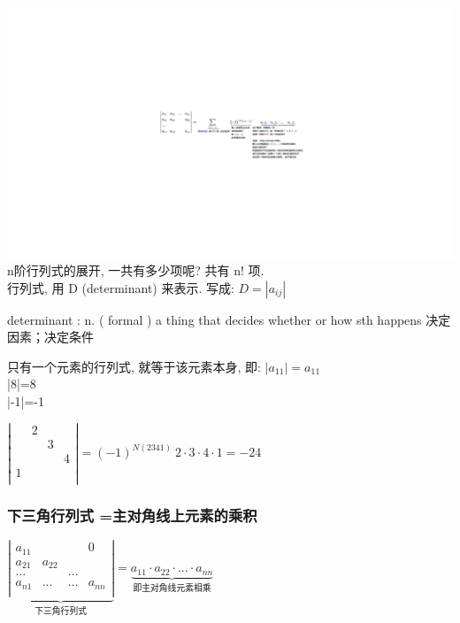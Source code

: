 \documentclass[UTF8]{ctexart}
\begin{document}
	\includegraphics[width=1\textwidth]{img/0003.pdf}\\
	
	n阶行列式的展开, 一共有多少项呢? 共有 n! 项. \\
	
	行列式, 用 D (determinant) 来表示. 写成: $	D=\left| a_{ij} \right|	$
	
	\begin{myEnvSample}
	determinant : n. ( formal ) a thing that decides whether or how sth happens 决定因素；决定条件
	\end{myEnvSample}

	只有一个元素的行列式, 就等于该元素本身, 即:	$	\left| a_{11} \right|=a_{11}	$\\
	|8|=8\\
	|-1|=-1\\
	
	\begin{myEnvSample}
$
\left| \begin{matrix}
	&		2&		&		\\
	&		&		3&		\\
	&		&		&		4\\
	1&		&		&		\\
\end{matrix} \right|=\left( -1 \right) ^{N\left( 2341 \right)}\ 2\cdot 3\cdot 4\cdot 1=-24
$
	\end{myEnvSample}
	
	
	
\subsubsection{下三角行列式 =主对角线上元素的乘积}

$
\underset{\text{下三角行列式}}{\underbrace{\left| \begin{matrix}
			a_{11}&		&		&	0	\\
			a_{21}&		a_{22}&		&		\\
			...&		&		...&		\\
			a_{n1}&		...&		...&		a_{nn}\\
		\end{matrix} \right|}}=\underset{\text{即主对角线元素相乘}}{\underbrace{a_{11}\cdot a_{22}\cdot ...\cdot a_{nn}}}
$
\end{document}

